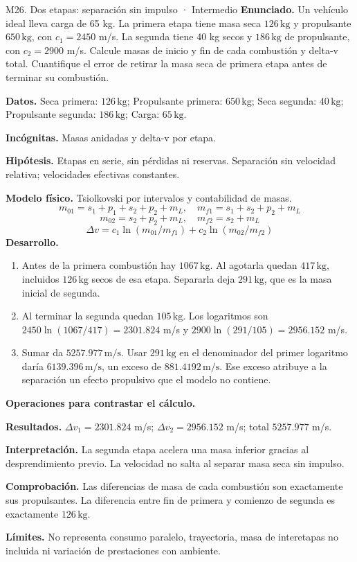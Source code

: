 \begin{studiumworked}{M26. Dos etapas: separación sin impulso · Intermedio}
\textbf{Enunciado.} Un vehículo ideal lleva carga de 65 kg. La primera etapa tiene masa seca $126\,\mathrm{kg}$ y propulsante $650\,\mathrm{kg}$, con $c_1=2450$ m/s. La segunda tiene 40 kg secos y $186\,\mathrm{kg}$ de propulsante, con $c_2=2900$ m/s. Calcule masas de inicio y fin de cada combustión y delta-v total. Cuantifique el error de retirar la masa seca de primera etapa antes de terminar su combustión.

\textbf{Datos.} Seca primera: $126\,\mathrm{kg}$; Propulsante primera: $650\,\mathrm{kg}$; Seca segunda: $40\,\mathrm{kg}$; Propulsante segunda: $186\,\mathrm{kg}$; Carga: $65\,\mathrm{kg}$.

\textbf{Incógnitas.} Masas anidadas y delta-v por etapa.

\textbf{Hipótesis.} Etapas en serie, sin pérdidas ni reservas. Separación sin velocidad relativa; velocidades efectivas constantes.

\textbf{Modelo físico.} Tsiolkovski por intervalos y contabilidad de masas.
\[m_{01}=s_1+p_1+s_2+p_2+m_L,\quad m_{f1}=s_1+s_2+p_2+m_L\]
\[m_{02}=s_2+p_2+m_L,\quad m_{f2}=s_2+m_L\]
\[\Delta v=c_1\ln(m_{01}/m_{f1})+c_2\ln(m_{02}/m_{f2})\]
\textbf{Desarrollo.}
\begin{enumerate}
\item Antes de la primera combustión hay $1067\,\mathrm{kg}$. Al agotarla quedan $417\,\mathrm{kg}$, incluidos $126\,\mathrm{kg}$ secos de esa etapa. Separarla deja $291\,\mathrm{kg}$, que es la masa inicial de segunda.
\item Al terminar la segunda quedan $105\,\mathrm{kg}$. Los logaritmos son $2450\ln(1067/417)=2301.824$ m/s y $2900\ln(291/105)=2956.152$ m/s.
\item Sumar da $5257.977\,\mathrm{m/s}$. Usar $291\,\mathrm{kg}$ en el denominador del primer logaritmo daría $6139.396\,\mathrm{m/s}$, un exceso de $881.4192\,\mathrm{m/s}$. Ese exceso atribuye a la separación un efecto propulsivo que el modelo no contiene.
\end{enumerate}
\textbf{Operaciones para contrastar el cálculo.}

\textbf{Resultados.} $\Delta v_1=2301.824$ m/s; $\Delta v_2=2956.152$ m/s; total $5257.977$ m/s.

\textbf{Interpretación.} La segunda etapa acelera una masa inferior gracias al desprendimiento previo. La velocidad no salta al separar masa seca sin impulso.

\textbf{Comprobación.} Las diferencias de masa de cada combustión son exactamente sus propulsantes. La diferencia entre fin de primera y comienzo de segunda es exactamente $126\,\mathrm{kg}$.

\textbf{Límites.} No representa consumo paralelo, trayectoria, masa de interetapas no incluida ni variación de prestaciones con ambiente.
\end{studiumworked}
